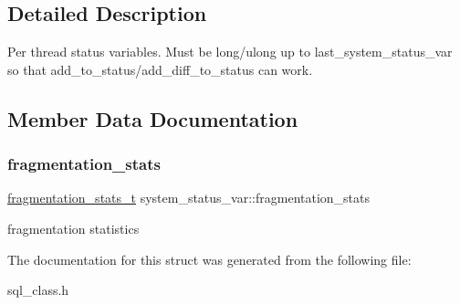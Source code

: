 \subsection{Detailed Description}
Per thread status variables. Must be long/ulong up to last\+\_\+system\+\_\+status\+\_\+var so that add\+\_\+to\+\_\+status/add\+\_\+diff\+\_\+to\+\_\+status can work. 

\subsection{Member Data Documentation}
\mbox{\label{structsystem__status__var_a67fdfd830fe0d78072c0fdd2c6106ad4}} 
\subsubsection{\texorpdfstring{fragmentation\+\_\+stats}{fragmentation\_stats}}
{\footnotesize\ttfamily \mbox{\hyperlink{structfragmentation__stats__t}{fragmentation\+\_\+stats\+\_\+t}} system\+\_\+status\+\_\+var\+::fragmentation\+\_\+stats}

fragmentation statistics 

The documentation for this struct was generated from the following file\+:\begin{DoxyCompactItemize}
\item 
sql\+\_\+class.\+h\end{DoxyCompactItemize}
